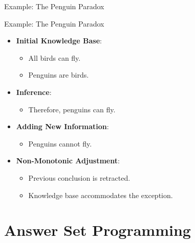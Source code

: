 \begin{frame}{Example: The Penguin Paradox}
    \begin{exampleblock}{Example: The Penguin Paradox}
        \begin{itemize}
            \item \textbf{Initial Knowledge Base}:
                  \begin{itemize}
                      \item All birds can fly.
                      \item Penguins are birds.
                  \end{itemize}
            \item \textbf{Inference}:
                  \begin{itemize}
                      \item Therefore, penguins can fly.
                  \end{itemize}
            \item \textbf{Adding New Information}:
                  \begin{itemize}
                      \item Penguins cannot fly.
                  \end{itemize}
            \item \textbf{Non-Monotonic Adjustment}:
                  \begin{itemize}
                      \item Previous conclusion is retracted.
                      \item Knowledge base accommodates the exception.
                  \end{itemize}
        \end{itemize}
    \end{exampleblock}
\end{frame}

\section{Answer Set Programming}

